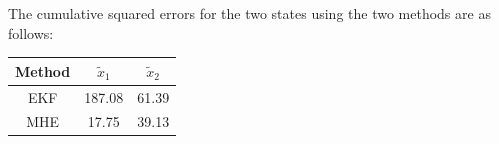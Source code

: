 The cumulative squared errors for the two states using the two methods are as follows:
\begin{table}[!h]
    \centering
    \begin{tabular}{c|c|c}
        Method & $\tilde x_1$ & $\tilde x_2$ \\
        \hline 
        EKF & 187.08 & 61.39 \\
        MHE & 17.75 & 39.13
    \end{tabular}
\end{table}


